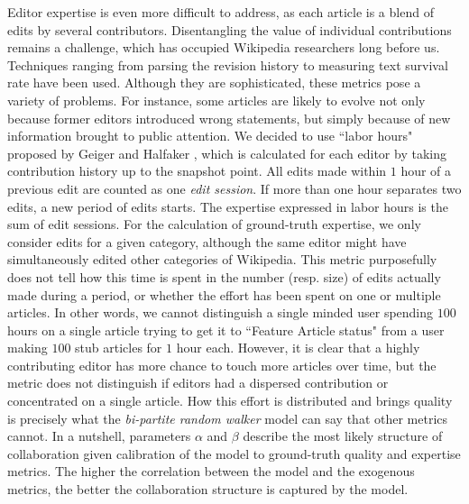 Editor expertise is even more difficult to address, as each article is a blend of edits by several contributors. Disentangling the value of individual contributions remains a challenge, which has occupied Wikipedia researchers long before us. Techniques ranging from parsing the revision history to measuring text survival rate \cite{adler2008measuringauthor} have been used. Although they are sophisticated, these metrics pose a variety of problems. For instance, some articles are likely to evolve not only because former editors introduced wrong statements, but simply because of new information brought to public attention. We decided to use ``labor hours" proposed by Geiger and Halfaker \cite{geiger2013}, which is calculated for each editor by taking contribution history up to the snapshot point. All edits made within $1$ hour of a previous edit are counted as one {\it edit session}. If more than one hour separates two edits, a new period of edits  starts. 
 The expertise expressed in labor hours is the sum of edit sessions. For the calculation of ground-truth expertise, we only consider edits for a given category, although the same editor might have simultaneously  edited other categories of Wikipedia. This metric purposefully does not tell how this time is spent in the number (resp. size) of edits actually made during a period, or whether the effort has been spent on one or multiple articles. In other words, we cannot distinguish a single minded user spending $100$ hours on a single article trying to get it to ``Feature Article status" from a user making $100$ stub articles for $1$ hour each.  However, it is clear that a highly contributing editor has more chance to touch more articles over time, but the metric does not distinguish if editors had a dispersed contribution or concentrated on a single article. How this effort is distributed and brings quality is precisely what the {\it bi-partite random walker} model can say that other metrics cannot. In a nutshell, parameters $\alpha$ and $\beta$ describe the most likely structure of collaboration given calibration of the model to ground-truth quality and expertise metrics. The higher the correlation between the model and the exogenous metrics, the better the collaboration structure is captured by the model. 


